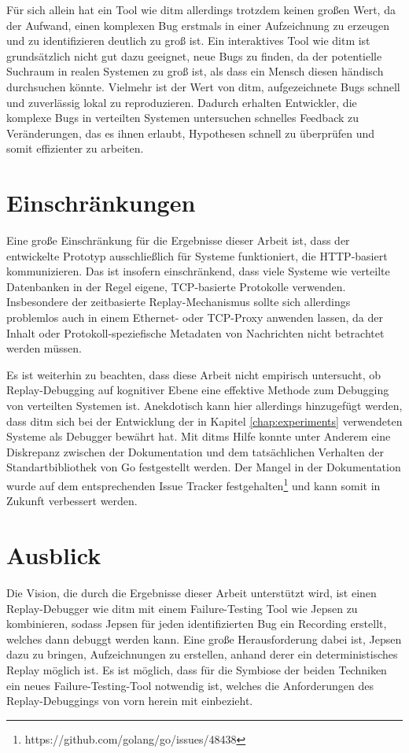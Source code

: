 \documentclass[12pt,a4paper]{report}
\begin{document}
Für sich allein hat ein Tool wie ditm allerdings trotzdem keinen großen Wert, da der Aufwand, einen komplexen Bug erstmals in
einer Aufzeichnung zu erzeugen und zu identifizieren deutlich zu groß ist. Ein interaktives Tool wie ditm ist grundsätzlich
nicht gut dazu geeignet, neue Bugs zu finden, da der potentielle Suchraum in realen Systemen zu groß ist, als dass ein Mensch
diesen händisch durchsuchen könnte. Vielmehr ist der Wert von ditm, aufgezeichnete Bugs schnell und zuverlässig lokal zu
reproduzieren. Dadurch erhalten Entwickler, die komplexe Bugs in verteilten Systemen untersuchen schnelles Feedback zu
Veränderungen, das es ihnen erlaubt, Hypothesen schnell zu überprüfen und somit effizienter zu arbeiten.

\section{Einschränkungen}
Eine große Einschränkung für die Ergebnisse dieser Arbeit ist, dass der entwickelte Prototyp ausschließlich für Systeme
funktioniert, die HTTP-basiert kommunizieren. Das ist insofern einschränkend, dass viele Systeme wie verteilte Datenbanken in der
Regel eigene, TCP-basierte Protokolle verwenden. Insbesondere der zeitbasierte Replay-Mechanismus sollte sich allerdings
problemlos auch in einem Ethernet- oder TCP-Proxy anwenden lassen, da der Inhalt oder Protokoll-speziefische Metadaten von
Nachrichten nicht betrachtet werden müssen.

Es ist weiterhin zu beachten, dass diese Arbeit nicht empirisch untersucht, ob Replay-Debugging auf kognitiver Ebene eine
effektive Methode zum Debugging von verteilten Systemen ist.  Anekdotisch kann hier allerdings hinzugefügt werden, dass ditm sich
bei der Entwicklung der in Kapitel \ref{chap:experiments} verwendeten Systeme als Debugger bewährt hat. Mit ditms Hilfe konnte
unter Anderem eine Diskrepanz zwischen der Dokumentation und dem tatsächlichen Verhalten der Standartbibliothek von Go
festgestellt werden. Der Mangel in der Dokumentation wurde auf dem entsprechenden Issue Tracker
festgehalten\footnote{https://github.com/golang/go/issues/48438} und kann somit in Zukunft verbessert werden.

\section{Ausblick}
Die Vision, die durch die Ergebnisse dieser Arbeit unterstützt wird, ist einen Replay-Debugger wie ditm mit einem Failure-Testing Tool
wie Jepsen zu kombinieren, sodass Jepsen für jeden identifizierten Bug ein Recording erstellt, welches dann debuggt werden kann.
Eine große Herausforderung dabei ist, Jepsen dazu zu bringen, Aufzeichnungen zu erstellen, anhand derer ein deterministisches
Replay möglich ist. Es ist möglich, dass für die Symbiose der beiden Techniken ein neues Failure-Testing-Tool notwendig ist,
welches die Anforderungen des Replay-Debuggings von vorn herein mit einbezieht.
\end{document}
